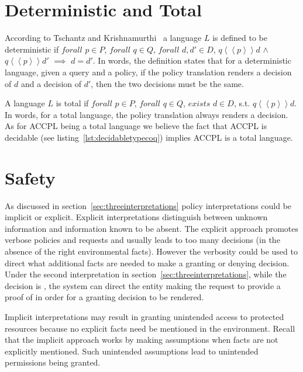 \section{Deterministic and Total}

According to Tschantz and Krishnamurthi~\cite{Tschantz} a language $L$ is defined to be deterministic if $forall$ $p \in P$, $forall$ $q \in Q$, $forall$ $d, d' \in D$, $q \left\langle\left\langle p  \right\rangle\right\rangle d$ $\land$ $q \left\langle\left\langle p  \right\rangle\right\rangle d'$ $\implies$ $d = d'$. In words, the definition states that for a deterministic language, given a query and a policy, if the policy translation renders a decision of $d$ and a decision of $d'$, then the two decisions must be the same.

A language $L$ is total if $forall$ $p \in P$, $forall$ $q \in Q$, $exists$ $d \in D$, s.t. $q \left\langle\left\langle p  \right\rangle\right\rangle d$. In words, for a total language, the policy translation always renders a decision. As for \ac{ACCPL} being a total language we believe the fact that \ac{ACCPL} is decidable (see listing~\ref{lst:decidabletypecoq}) implies \ac{ACCPL} is a total language.


\section{Safety}

As discussed in section~\ref{sec:threeinterpretations} policy interpretations could be implicit or explicit. Explicit interpretations distinguish between unknown information and information known to be absent. The explicit approach promotes verbose policies and requests and usually leads to too many  decisions (in the absence of the right environmental facts). However the verbosity could be used to direct what additional facts are needed to make a granting or denying decision. Under the second interpretation in section~\ref{sec:threeinterpretations}, while the decision is , the system can direct the entity making the request to provide a proof of  in order for a granting decision to be rendered. 

Implicit interpretations may result in granting unintended access to protected resources because no explicit facts need be mentioned in the environment. Recall that the implicit approach works by making assumptions when facts are not explicitly mentioned. Such unintended assumptions lead to unintended permissions being granted.

